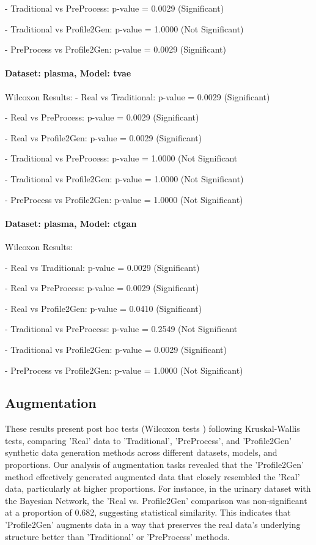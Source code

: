 \documentclass{article}
\theoremstyle{plain}
\theoremstyle{definition}
\theoremstyle{remark}
\begin{document}
- Traditional vs PreProcess: p-value = 0.0029 (Significant)


- Traditional vs Profile2Gen: p-value = 1.0000 (Not Significant)


- PreProcess vs Profile2Gen: p-value = 0.0029 (Significant)



\paragraph{Dataset: plasma, Model: tvae}
Wilcoxon Results:
- Real vs Traditional: p-value = 0.0029 (Significant)


- Real vs PreProcess: p-value = 0.0029 (Significant)


- Real vs Profile2Gen: p-value = 0.0029 (Significant)


- Traditional vs PreProcess: p-value = 1.0000 (Not Significant


- Traditional vs Profile2Gen: p-value = 1.0000 (Not Significant)


- PreProcess vs Profile2Gen: p-value = 1.0000 (Not Significant)



\paragraph{Dataset: plasma, Model: ctgan}
Wilcoxon Results:


- Real vs Traditional: p-value = 0.0029 (Significant)


- Real vs PreProcess: p-value = 0.0029 (Significant)


- Real vs Profile2Gen: p-value = 0.0410 (Significant)


- Traditional vs PreProcess: p-value = 0.2549 (Not Significant


- Traditional vs Profile2Gen: p-value = 0.0029 (Significant)


- PreProcess vs Profile2Gen: p-value = 1.0000 (Not Significant)



\subsection{Augmentation}
These results present post hoc tests (Wilcoxon tests ) following Kruskal-Wallis tests, comparing 'Real' data to 'Traditional', 'PreProcess', and 'Profile2Gen' synthetic data generation methods across different datasets, models, and proportions. 
Our analysis of augmentation tasks revealed that the 'Profile2Gen' method effectively generated augmented data that closely resembled the 'Real' data, particularly at higher proportions. For instance, in the urinary dataset with the Bayesian Network, the 'Real vs. Profile2Gen' comparison was non-significant at a proportion of 0.682, suggesting statistical similarity. This indicates that 'Profile2Gen' augments data in a way that preserves the real data's underlying structure better than 'Traditional' or 'PreProcess' methods.
\end{document}
